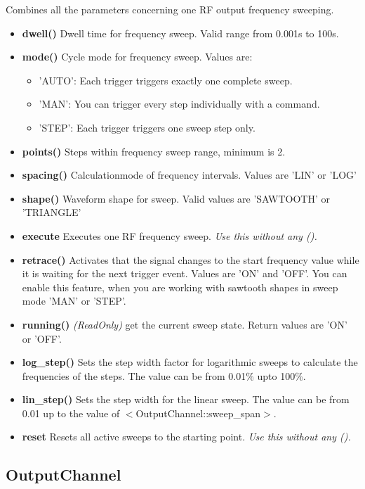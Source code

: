 \documentclass[11pt]{article} %
\begin{document}
Combines all the parameters concerning one RF output frequency sweeping.
\begin{itemize}
\item {\bf dwell()} Dwell time for frequency sweep. Valid range from 0.001s to 100s.
\item {\bf mode()} Cycle mode for frequency sweep. Values are:
	\begin{itemize}[]
	\item 'AUTO': Each trigger triggers exactly one complete sweep.
	\item 'MAN':  You can trigger every step individually with a command.
	\item 'STEP': Each trigger triggers one sweep step only.
	\end{itemize}
\item {\bf points()} Steps within frequency sweep range, minimum is 2.
\item {\bf spacing()} Calculationmode of frequency intervals. Values are 'LIN' or 'LOG'
\item {\bf shape()} Waveform shape for sweep. Valid values are 'SAWTOOTH' or 'TRIANGLE'
\item {\bf execute} Executes one RF frequency sweep. {\it Use this without any ().}
\item {\bf retrace()} Activates that the signal changes to the start frequency value while it is waiting for the
next trigger event.  Values are 'ON' and 'OFF'. You can enable this feature, when you are working with sawtooth shapes in sweep mode 'MAN' or 'STEP'.
\item {\bf running()} {\it (ReadOnly)} get the current sweep state. Return values are 'ON' or 'OFF'.
\item {\bf log\_step()} Sets the step width factor for logarithmic sweeps to calculate the frequencies of the
steps. The value can be from 0.01\% upto 100\%.
\item {\bf lin\_step()} Sets the step width for the linear sweep. The value can be from 0.01 up to the value of $<$OutputChannel::sweep\_span$>$.
\item {\bf reset} Resets all active sweeps to the starting point. {\it Use this without any ().}
\end{itemize}


\subsection{OutputChannel}
\end{document}
